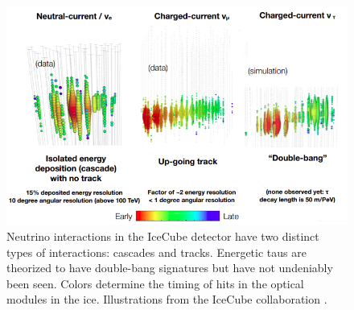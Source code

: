 \begin{figure}
\centering
\includegraphics[width=\textwidth]{chapter4/img/ICinteractions2.png}
\caption{Neutrino interactions in the IceCube detector have two distinct types of interactions: cascades and tracks. Energetic taus are theorized to have double-bang signatures but have not undeniably been seen. Colors determine the timing of hits in the optical modules in the ice. Illustrations from the IceCube collaboration \cite{kjeroSignatures}.}
\label{fig:ICinteractions2}
\end{figure}

 






